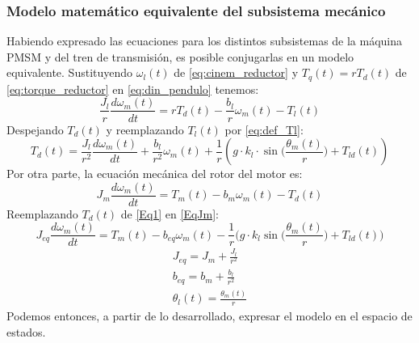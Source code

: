 \documentclass[12pt, a4paper,journal, onecolumn, compsoc]{IEEEtran}
\begin{document}
    \subsubsection{Modelo matemático equivalente del subsistema mecánico}
    Habiendo expresado las ecuaciones para los distintos subsistemas de la máquina PMSM y del tren de transmisión, es posible conjugarlas en un modelo equivalente.
    Sustituyendo \(\omega_l(t)\) de \eqref{eq:cinem_reductor} y \(T_q(t) = rT_d(t)\) de \eqref{eq:torque_reductor} en \eqref{eq:din_pendulo} tenemos:
    \begin{equation}\label{EqAux1}
        \frac{J_l}{r}\frac{d\omega_m(t)}{dt} = rT_d(t)-\frac{b_l}{r}\omega_m(t)-T_l(t)
    \end{equation}
    Despejando \(T_d(t)\) y reemplazando \(T_l(t)\) por \eqref{eq:def_Tl}:
    \begin{equation}\label{Eq1}
        T_d(t)=\frac{J_l}{r^2}\frac{d\omega_m(t)}{dt}+\frac{b_l}{r^2}\omega_m(t)+\frac{1}{r}\left(g\cdot k_l\cdot \sin\Big(\frac{\theta_m(t)}{r}\Big)+T_{ld}(t)\right)
    \end{equation}
    Por otra parte, la ecuación mecánica del rotor del motor es:
    \begin{equation}\label{EqJm}
        J_m\frac{d\omega_m(t)}{dt}=T_m(t)-b_m\omega_m(t)-T_d(t)
    \end{equation}
    Reemplazando \(T_d(t)\) de \eqref{Eq1} en  \eqref{EqJm}:
    \begin{equation}
        J_{eq}\frac{d\omega_m(t)}{dt}=T_m(t)-b_{eq}\omega_m(t)-\frac{1}{r}\Big(g\cdot k_l \sin{\Big(\frac{\theta_m(t)}{r}\Big)} + T_{ld}(t)\Big)
    \end{equation}
    \begin{gather}
        J_{eq} = J_m +\frac{J_l}{r^2}\\
        b_{eq} = b_m + \frac{b_l}{r^2}\\
        \theta_l(t)=\frac{\theta_m(t)}{r}
    \end{gather}
    Podemos entonces, a partir de lo desarrollado, expresar el modelo en el espacio de estados.
\end{document}
